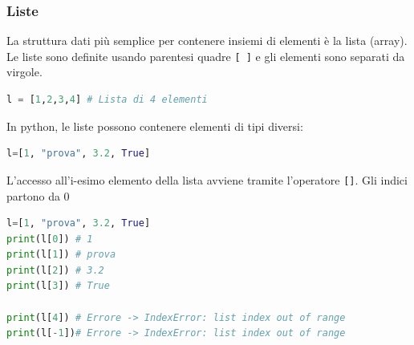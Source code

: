 \subsubsection{Liste}
La struttura dati più semplice per contenere insiemi di elementi è la lista (array). Le liste sono definite usando parentesi quadre \texttt{[ ]} e gli elementi sono separati da virgole.

\begin{lstlisting}[language = python, frame = none]
l = [1,2,3,4] # Lista di 4 elementi
\end{lstlisting}

In python, le liste possono contenere elementi di tipi diversi:
\begin{lstlisting}[language = python, frame = none]
l=[1, "prova", 3.2, True]
\end{lstlisting}

L'accesso all'i-esimo elemento della lista avviene tramite l'operatore \verb|[]|. Gli indici partono da 0
\begin{lstlisting}[language = python, frame = none]
l=[1, "prova", 3.2, True]
print(l[0]) # 1
print(l[1]) # prova
print(l[2]) # 3.2
print(l[3]) # True

print(l[4]) # Errore -> IndexError: list index out of range
print(l[-1])# Errore -> IndexError: list index out of range
\end{lstlisting}

